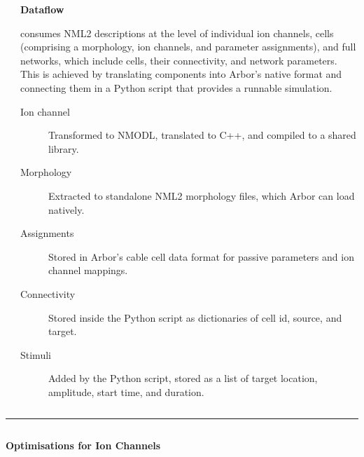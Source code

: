 \documentclass{beamer}
\begin{document}
\begin{frame}[t, fragile]
\begin{columns}
\begin{column}{0.44\textwidth}
    \end{column}
    \begin{column}{0.54\textwidth}
      \textbf{Dataflow}

      \nmlcc consumes NML2 descriptions at the level of individual ion
      channels, cells (comprising a morphology, ion channels, and parameter
      assignments), and full networks, which include cells, their connectivity,
      and network parameters. This is achieved by translating components into
      Arbor's native format and connecting them in a Python script that provides
      a runnable simulation.
      \begin{description}
        \item[Ion channel] Transformed to NMODL, translated to C++, and compiled to a
              shared library.
        \item[Morphology] Extracted to standalone NML2 morphology files, which Arbor can
              load natively.
        \item[Assignments] Stored in Arbor's cable cell data format for passive parameters and ion channel mappings.
        \item[Connectivity] Stored inside the Python script as dictionaries of cell id, source, and target.
        \item[Stimuli] Added by the Python script, stored as a list of target location, amplitude, start time, and duration.
      \end{description}
    \end{column}
  \end{columns}
  \vspace*{1ex}
  \textcolor{arbgrey}{\rule{\textwidth}{0.5ex}}
  \vspace*{-1ex}
  \begin{columns}[t]
    \begin{column}{0.49\textwidth}
      \textbf{Optimisations for Ion Channels}


\end{column}
\end{columns}
\end{frame}
\end{document}
